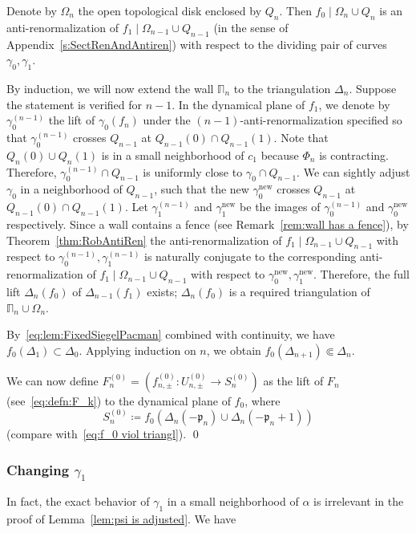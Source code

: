 \documentclass[]{amsart}
\newcommand{\bDelta}{{\mathbb{\Delta}}}
\newcommand{\bPi}{{\mathbb{\Pi}}}
\newcommand{\pp}{\mathfrak{p}}
\newcommand\wall{{Q}}
\newcommand\inn{{\Omega}}
\newcommand\new{{\operatorname{new}}}
\theoremstyle{remark}
\numberwithin{equation}{section}
\theoremstyle{definition}
\begin{document}
Denote by $\inn_n$ the open topological disk enclosed by $\wall_n$. Then $f_0\mid \inn_n \cup \wall_n$ is an anti-renormalization of $f_1\mid \inn_{n-1} \cup \wall_{n-1}$ (in the sense of Appendix~\ref{s:SectRenAndAntiren}) with respect to the dividing pair of curves $\gamma_0,\gamma_1$. 


By induction, we will now extend the wall $\bPi_n$ to the triangulation $\bDelta_n$. Suppose the statement is verified for $n-1$.  In the dynamical plane of $f_1$, we denote by $\gamma_0^{(n-1)}$ the lift of $\gamma_0(f_n)$ under the $(n-1)$-anti-renormalization specified so that $\gamma_0^{(n-1)}$ crosses $\wall_{n-1}$ at $\wall_{n-1}(0)\cap \wall_{n-1}(1)$. Note that $\wall_n(0)\cup \wall_n(1)$ is in a small neighborhood of $c_1$ because $\Phi_n$ is contracting. Therefore,  $\gamma_0^{(n-1)}\cap \wall_{n-1}$ is uniformly close to $\gamma_0\cap \wall_{n-1}$. We can sightly adjust $\gamma_0$ in a neighborhood of $\wall_{n-1}$, such that the new $\gamma_0^\new$ crosses $\wall_{n-1}$ at $\wall_{n-1}(0)\cap \wall_{n-1}(1)$. Let $\gamma_1^{(n-1)}$ and $\gamma_1^\new$ be the images of $\gamma_0^{(n-1)}$ and $\gamma_0^\new$ respectively. Since a wall contains a fence (see Remark~\ref{rem:wall has a fence}), by Theorem~\ref{thm:RobAntiRen} the anti-renormalization of $f_1\mid  \inn_{n-1} \cup \wall_{n-1}$ with respect to $\gamma_0^{(n-1)}, \gamma_1^{(n-1)}$ is naturally conjugate to the corresponding anti-renormalization of $f_1\mid  \inn_{n-1} \cup \wall_{n-1}$ with respect to  $\gamma_0^\new, \gamma_1^\new$. Therefore,  the full lift $\bDelta_{n}(f_0)$ of $\bDelta_{n-1}(f_1)$ exists; $\bDelta_{n}(f_0)$ is a  required triangulation of $\bPi_n\cup \inn_n$.



  By~\eqref{eq:lem:FixedSiegelPacman} combined with continuity, we have $f_0(\bDelta_1)\subset \bDelta_0$.  Applying induction on $n$, we obtain $f_0(\bDelta_{n+1})\Subset \bDelta_n$. 


We can now define $F_n^{(0)}=\left(f^{(0)}_{n,\pm }\colon U^{(0)}_{n,\pm}\to S_{n}^{(0)}\right)$ as the lift of $F_n$ (see~\eqref{eq:defn:F_k}) to the dynamical plane of $f_0$, where \[S_n^{(0)}\coloneqq f_0\left( \Delta_n(-\pp_n)\cup\Delta_n(-\pp_n+1) \right)\]  
(compare with~\eqref{eq:f_0 viol triangl}). \qed

\subsubsection{Changing $\gamma_1$}
In fact, the exact behavior of $\gamma_1$ in a small neighborhood of $\alpha$ is irrelevant in the proof of Lemma~\ref{lem:psi is adjusted}. We have  
\end{document}

